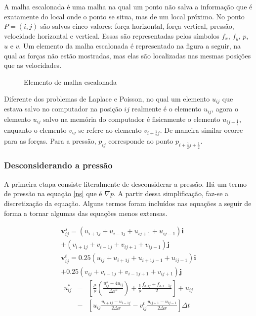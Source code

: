 \documentclass[journal]{IEEEtran}
\begin{document}
A malha escalonada é uma malha na qual um ponto não salva a informação que é exatamente do local onde o ponto se situa, mas de um local próximo. No ponto $P=(i,j)$ são salvos cinco valores: força horizontal, força vertical, pressão, velocidade horizontal e vertical. Essas são representadas pelos símbolos $f_x$, $f_y$, $p$, $u$ e $v$. Um elemento da malha escalonada é representado na figura a seguir, na qual as forças não estão mostradas, mas elas são localizadas nas mesmas posições que as velocidades.

\begin{figure}[!ht]
\centering
{}
\caption{Elemento de malha escalonada}
\end{figure}

Diferente dos problemas de Laplace e Poisson, no qual um elemento $u_{ij}$ que estava salvo no computador na posição $ij$ realmente é o elemento $u_{ij}$, agora o elemento $u_{ij}$ salvo na memória do computador é fisicamente o elemento $u_{ij+\frac{1}{2}}$, enquanto o elemento $v_{ij}$ se refere ao elemento $v_{i+\frac{1}{2}j}$. De maneira similar ocorre para as forças. Para a pressão, $p_{ij}$ corresponde ao ponto $p_{i+\frac{1}{2}j+\frac{1}{2}}$.


\subsubsection{Desconsiderando a pressão}
A primeira etapa consiste literalmente de desconsiderar a pressão. Há um termo de pressão na equação \ref{ns} que é $\nabla p$. A partir dessa simplificação, faz-se a discretização da equação. Alguns termos foram incluídos nas equações a seguir de forma a tornar algumas das equações menos extensas.
 
\begin{eqnarray}
\textbf{v}_{ij}^s=(u_{i+1j}+u_{i-1j}+u_{ij+1}+u_{ij-1})\textbf{i} 
\nonumber \\+(v_{i+1j}+v_{i-1j}+v_{ij+1}+v_{ij-1})\textbf{j}\\
\textbf{v}_{ij}^t=0.25(u_{ij}+u_{i+1j}+u_{i+1j-1}+u_{ij-1})\textbf{i}\nonumber \\
+0.25(v_{ij}+v_{i-1j}+v_{i-1j+1}+v_{ij+1})\textbf{j}
\end{eqnarray}
\begin{eqnarray}
u_{ij}^{*}&=&\left[\frac{\mu}{\rho}\left(\frac{u_{ij}^s-4u_{ij}}{\Delta
x^2}\right)+\frac{1}{\rho}\frac{f_{x,ij}+f_{x,i-1j}}{2}\right] + u_{ij}\nonumber \\
&-&\left[u_{ij}\frac{u_{i+1j}-u_{i-1j}}{2\Delta
x}-v_{ij}^t\frac{u_{ij+1}-u_{ij-1}}{2\Delta x}\right]\Delta t
\end{eqnarray}
\end{document}
